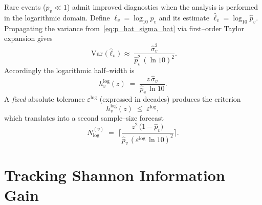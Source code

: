 Rare events ($p_v\ll 1$) admit improved diagnostics when the analysis is
performed in the logarithmic domain.  Define $\ell_v = \log_{10} p_v$ and its
estimate $\widehat{\ell}_v = \log_{10} \widehat{p}_v$.
Propagating the variance from~\eqref{eq:p_hat_sigma_hat} via first--order
Taylor expansion gives
\begin{equation}
  \operatorname{Var}\!\bigl(\widehat{\ell}_v\bigr)
  \;\approx\;
  \frac{\widehat{\sigma}_v^{2}}
       {\widehat{p}_v^{2}\,(\ln 10)^{2}}.
\end{equation}
Accordingly the logarithmic half--width is
\begin{equation}
  h^{\log}_{v}(z)
  \;=\;
  \frac{z\,\widehat{\sigma}_v}{\widehat{p}_v\,\ln 10}.
\end{equation}
A \emph{fixed} absolute tolerance $\varepsilon^{\log}$ (expressed in decades)
produces the criterion
\begin{equation}
  h^{\log}_{v}(z) \;\le\; \varepsilon^{\log},
  \label{eq:log_conv}
\end{equation}
which translates into a second sample--size forecast
\begin{equation}
  N^{(v)}_{\log}
  \;=\;
  \biggl\lceil
    \frac{z^{2}\,\bigl(1-\widehat{p}_v\bigr)}
         {\widehat{p}_v\,(\varepsilon^{\log}\,\ln 10)^{2}}
  \biggr\rceil.
  \label{eq:trials_required_log}
\end{equation}

\section{Tracking Shannon Information Gain}
\label{subsec:info_gain}

